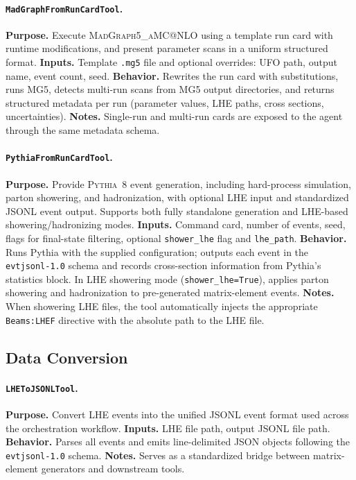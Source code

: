 \documentclass[11pt,oneside]{article}
\numberwithin{equation}{section}
\begin{document}
\begin{appendix}
\paragraph{\texttt{MadGraphFromRunCardTool}.}
\textbf{Purpose.} Execute \textsc{MadGraph5\_aMC@NLO} using a template run card with runtime modifications, and present parameter scans in a uniform structured format.  
\textbf{Inputs.} Template \texttt{.mg5} file and optional overrides: UFO path, output name, event count, seed.  
\textbf{Behavior.} Rewrites the run card with substitutions, runs MG5, detects multi-run scans from MG5 output directories, and returns structured metadata per run (parameter values, LHE paths, cross sections, uncertainties).  
\textbf{Notes.} Single-run and multi-run cards are exposed to the agent through the same metadata schema.

\paragraph{\texttt{PythiaFromRunCardTool}.}
\textbf{Purpose.} Provide \textsc{Pythia}~8 event generation, including hard-process simulation, parton showering, and hadronization, with optional LHE input and standardized JSONL event output. Supports both fully standalone generation and LHE-based showering/hadronizing modes.
\textbf{Inputs.} Command card, number of events, seed, flags for final-state filtering, optional \texttt{shower\_lhe} flag and \texttt{lhe\_path}.
\textbf{Behavior.} Runs Pythia with the supplied configuration; outputs each event in the \texttt{evtjsonl-1.0} schema and records cross-section information from Pythia's statistics block. In LHE showering mode (\texttt{shower\_lhe=True}), applies parton showering and hadronization to pre-generated matrix-element events.
\textbf{Notes.} When showering LHE files, the tool automatically injects the appropriate \texttt{Beams:LHEF} directive with the absolute path to the LHE file.


\subsection{Data Conversion}

\paragraph{\texttt{LHEToJSONLTool}.}
\textbf{Purpose.} Convert LHE events into the unified JSONL event format used across the orchestration workflow.  
\textbf{Inputs.} LHE file path, output JSONL file path.  
\textbf{Behavior.} Parses all events and emits line-delimited JSON objects following the \texttt{evtjsonl-1.0} schema.  
\textbf{Notes.} Serves as a standardized bridge between matrix-element generators and downstream tools.


\end{appendix}
\end{document}
